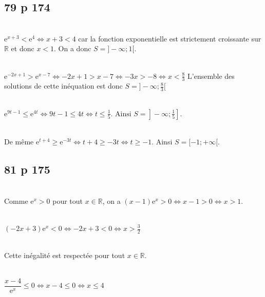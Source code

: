 \documentclass[12pt,a4paper]{book}
\begin{document}
 \subsection*{79 p 174}
 \begin{enumMet}
     \item {}\\
     $\mathrm{e}^{x+3}<\mathrm{e}^4 \Leftrightarrow x+3<4$ car la fonction exponentielle est strictement croissante sur $\mathbb{R}$ et donc $x<1$. On a donc $S=]-\infty ; 1[$.
     \item {}\\
     $\mathrm{e}^{-2 x+1}>\mathrm{e}^{x-7} \Leftrightarrow-2 x+1>x-7 \Leftrightarrow-3 x>-8 \Leftrightarrow x<\frac{8}{3}$
     L'ensemble des solutions de cette inéquation est donc $S=]-\infty ; \frac{8}{3}[$
     \item {}\\
     $\left.\left.\mathrm{e}^{9 t-1} \leqslant \mathrm{e}^{4 t} \Leftrightarrow 9 t-1 \leqslant 4 t \Leftrightarrow t \leqslant \frac{1}{5} \text {. Ainsi } S=\right]-\infty ; \frac{1}{5}\right] \text {. }$
     \item {}\\
     De même $\mathrm{e}^{t+4} \geqslant \mathrm{e}^{-3 t} \Leftrightarrow t+4 \geqslant-3 t \Leftrightarrow t \geqslant-1$. Ainsi $S=[-1 ;+\infty[$.
 \end{enumMet}

 \subsection*{81 p 175}
 \begin{enumMet}
     \item {}\\
     Comme $\mathrm{e}^x>0$ pour tout $x \in \mathbb{R}$, on a $(x-1) \mathrm{e}^x>0 \Leftrightarrow x-1>0 \Leftrightarrow x>1$.
     \item {}\\
     $(-2 x+3) \mathrm{e}^x<0 \Leftrightarrow-2 x+3<0 \Leftrightarrow x>\frac{3}{2}$
     \item {}\\
     Cette inégalité est respectée pour tout $x \in \mathbb{R}$.
     \item {}\\
     $\dfrac{x-4}{\mathrm{e}^x} \leqslant 0 \Leftrightarrow x-4 \leqslant 0 \Leftrightarrow x \leqslant 4$
 \end{enumMet}
\end{document}
